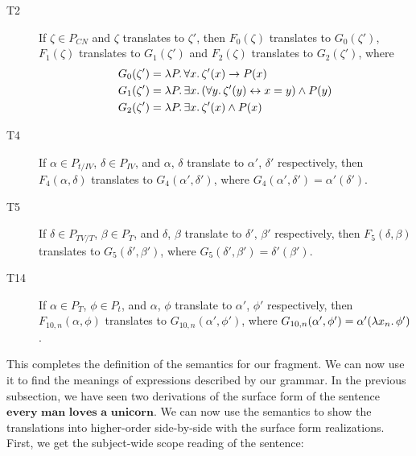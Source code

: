 \begin{description}
\item[T2] If $\zeta \in P_{CN}$ and $\zeta$ translates to $\zeta'$, then
  $F_0(\zeta)$ translates to $G_0(\zeta')$, $F_1(\zeta)$ translates to
  $G_1(\zeta')$ and $F_2(\zeta)$ translates to $G_2(\zeta')$, where
  \begin{align*}
    & G_0(\zeta') = \lambda P.\, \forall x.\, \zeta'(x) \to P(x) \\
    & G_1(\zeta') = \lambda P.\, \exists x.\, (\forall y.\, \zeta'(y) \leftrightarrow x
      = y) \land P(y) \\
    & G_2(\zeta') = \lambda P.\, \exists x.\, \zeta'(x) \land P(x)
  \end{align*}

\item[T4] If $\alpha \in P_{t / IV}$, $\delta \in P_{IV}$, and $\alpha$,
  $\delta$ translate to $\alpha'$, $\delta'$ respectively, then
  $F_4(\alpha, \delta)$ translates to $G_4(\alpha', \delta')$, where
  $G_4(\alpha', \delta') = \alpha'(\delta')$.

\item[T5] If $\delta \in P_{TV / T}$, $\beta \in P_{T}$, and $\delta$,
  $\beta$ translate to $\delta'$, $\beta'$ respectively, then
  $F_5(\delta, \beta)$ translates to $G_5(\delta', \beta')$, where
  $G_5(\delta', \beta') = \delta'(\beta')$.

\item[T14] If $\alpha \in P_T$, $\phi \in P_t$, and $\alpha$, $\phi$
  translate to $\alpha'$, $\phi'$ respectively, then
  $F_{10,n}(\alpha, \phi)$ translates to $G_{10,n}(\alpha', \phi')$, where
  $G_{10,n}(\alpha', \phi') = \alpha'(\lambda x_n.\, \phi')$.
\end{description}

This completes the definition of the semantics for our fragment. We can now
use it to find the meanings of expressions described by our grammar. In the
previous subsection, we have seen two derivations of the surface form of
the sentence $\textbf{every man loves a unicorn}$. We can now use the
semantics to show the translations into higher-order side-by-side with the
surface form realizations. First, we get the subject-wide scope reading of
the sentence:

